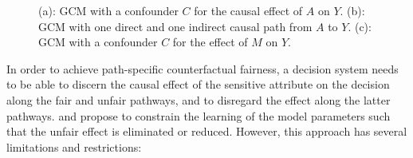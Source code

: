 \documentclass{article}
\begin{document}
\begin{figure}[t]
\begin{center}
\hskip0.1cm
\hskip0.1cm
\end{center}
\caption{(a): GCM with a confounder $C$ for the causal effect of $A$ on $Y$. (b): GCM with one direct and one indirect causal path from $A$ to $Y$. (c): GCM with a confounder $C$ for the effect of $M$ on $Y$.}
\label{fig:GCM}
\vspace{-0.0cm}
\end{figure}
In order to achieve path-specific counterfactual fairness, a decision system needs to be able to discern the causal effect of the sensitive attribute on the decision along the fair and unfair pathways, 
and to disregard the effect along the latter pathways.
\citet{kilbertus17avoiding} and \citet{nabi18fair} %
propose to constrain the learning of the model parameters such that the unfair effect is eliminated or reduced.
However, this approach has several limitations and restrictions: \\[-17pt]
\end{document}
